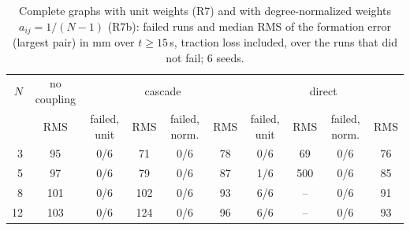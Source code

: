 \begin{table}[!t]\centering\footnotesize
\caption{Complete graphs with unit weights (R7) and with degree-normalized weights $a_{ij}=1/(N-1)$ (R7b): failed runs and median RMS of the formation error (largest pair) in mm over $t\ge15$\,s, traction loss included, over the runs that did not fail; 6 seeds.}\label{tab:r7b}
\begin{adjustbox}{max width=\textwidth}
\begin{tabular}{@{}rccccccccc@{}}\toprule
$N$ & no coupling & \multicolumn{4}{c}{cascade} & \multicolumn{4}{c}{direct}\\\cmidrule(lr){3-6}\cmidrule(lr){7-10} & RMS & failed, unit & RMS & failed, norm. & RMS & failed, unit & RMS & failed, norm. & RMS\\\midrule
3 & 95 & 0/6 & 71 & 0/6 & 78 & 0/6 & 69 & 0/6 & 76\\
5 & 97 & 0/6 & 79 & 0/6 & 87 & 1/6 & 500 & 0/6 & 85\\
8 & 101 & 0/6 & 102 & 0/6 & 93 & 6/6 & -- & 0/6 & 91\\
12 & 103 & 0/6 & 124 & 0/6 & 96 & 6/6 & -- & 0/6 & 93\\
\bottomrule\end{tabular}
\end{adjustbox}
\end{table}
